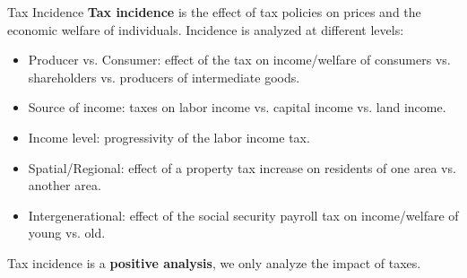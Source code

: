 \documentclass[10pt]{extarticle}
\begin{document}
  \begin{problem}{Tax Incidence}
    \textbf{Tax incidence} is the effect of tax policies on prices and the economic welfare of individuals. Incidence is analyzed at different levels:
    \begin{itemize}
      \item Producer vs. Consumer: effect of the tax on income/welfare of consumers vs. shareholders vs. producers of intermediate goods.
      \item Source of income: taxes on labor income vs. capital income vs. land income.
      \item Income level: progressivity of the labor income tax.
      \item Spatial/Regional: effect of a property tax increase on residents of one area vs. another area.
      \item Intergenerational: effect of the social security payroll tax on income/welfare of young vs. old.
    \end{itemize}
    Tax incidence is a \textbf{positive analysis}, we only analyze the impact of taxes.
  \end{problem}
\end{document}
